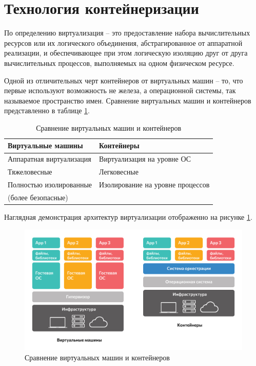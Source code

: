 \section{Технология контейнеризации}
По определению виртуализация -- это предоставление набора вычислительных
ресурсов или их логического объединения, абстрагированное от аппаратной
реализации, и обеспечивающее при этом логическую изоляцию друг от друга
вычислительных процессов, выполняемых на одном физическом ресурсе.

Одной из отличительных черт контейнеров от виртуальных машин -- то, что первые
используют возможность не железа, а операционной системы\cite{learning-docker},
так называемое пространство имен. Сравнение виртуальных машин и контейнеров
представленно в таблице \ref{tab:virt-cont}.
\begin{table}[H]
    \centering
    \caption{Сравнение виртуальных машин и контейнеров}
    \begin{tabular}{|l|l|}
        \hline
        Виртуальные машины & Контейнеры \\\hline
        Аппаратная виртуализация & Виртуализация на уровне ОС \\\hline
        Тяжеловесные             & Легковесные \\\hline
        Полностью изолированные  & Изолирование на уровне процессов \\
        (более безопасные)       & \\\hline
    \end{tabular}
    \label{tab:virt-cont}
\end{table}

Наглядная демонстрация архитектур виртуализации отображенно на рисунке
\ref{fig:virt-cont}.
\begin{figure}[H]
    \centering
    \includegraphics[scale=0.28]{inc/img/cont-vs-virt.png}
    \caption{Сравнение виртуальных машин и контейнеров}
    \label{fig:virt-cont}
\end{figure}

